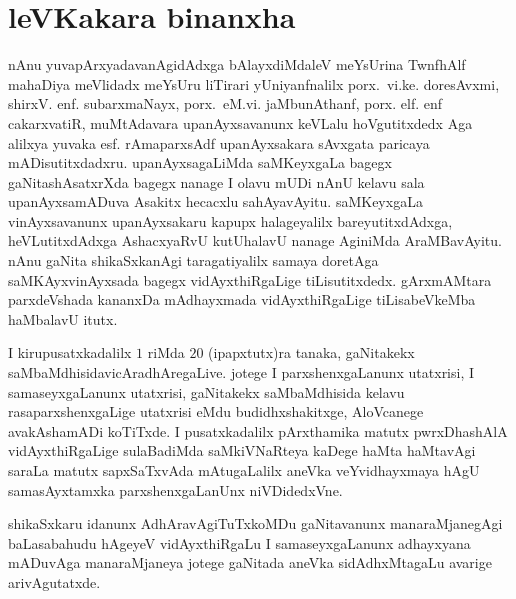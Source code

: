 {
\makeatletter
\def\@makechapterhead#1{%
  \vspace*{5\p@}%
  {\parindent \z@ \raggedright \normalfont
    \ifnum \c@secnumdepth >\m@ne
      \if@mainmatter
        \LARGE\bfseries \@chapapp\space\thechapter
        \vskip 4pt
        \par\nobreak
        \vskip 5\p@
      \fi
    \fi
    \interlinepenalty\@M
    \LARGE\bfseries #1\par\nobreak
    \vskip 15\p@
  }}
  \makeatother
 \chapter{leVKakara binanxha}


\qquad nAnu yuvapArxyadavanAgidAdxga  bAlayxdiMdaleV meYsUrina TwnfhAlf mahaDiya meVlidadx meYsUru liTirari yUniyanfnalilx porx.~vi.ke. doresAvxmi, shirxV. enf. subarxmaNayx, porx.~eM.vi. jaMbunAthanf, porx. elf. enf cakarxvatiR, muMtAdavara upanAyxsavanunx keVLalu hoVgutitxdedx Aga alilxya yuvaka esf. rAmaparxsAdf upanAyxsakara sAvxgata paricaya mADisutitxdadxru.  upanAyxsagaLiMda saMKeyxgaLa bagegx gaNitashAsatxrXda bagegx nanage I olavu mUDi nAnU kelavu sala upanAyxsamADuva Asakitx hecacxlu sahAyavAyitu. saMKeyxgaLa vinAyxsavanunx upanAyxsakaru kapupx halageyalilx bareyutitxdAdxga, heVLutitxdAdxga AshacxyaRvU kutUhalavU nanage AginiMda AraMBavAyitu. nAnu gaNita shikaSxkanAgi taragatiyalilx samaya doretAga saMKAyxvinAyxsada bagegx vidAyxthiRgaLige tiLisutitxdedx. gArxmAMtara parxdeVshada kananxDa mAdhayxmada vidAyxthiRgaLige tiLisabeVkeMba haMbalavU itutx.

 I kirupusatxkadalilx $1$ riMda $20$ (ipapxtutx)ra tanaka, gaNitakekx saMbaMdhisida\break vicAradhAregaLive. jotege I parxshenxgaLanunx utatxrisi, I samaseyxgaLanunx utatxrisi, gaNitakekx saMbaMdhisida kelavu rasaparxshenxgaLige utatxrisi eMdu budidhxshakitxge, AloVcanege avakAshamADi koTiTxde. I pusatxkadalilx pArxthamika matutx pwrxDhashAlA vidAyxthiRgaLige sulaBadiMda saMkiVNaRteya kaDege haMta haMtavAgi saraLa matutx sapxSaTxvAda mAtugaLalilx aneVka veYvidhayxmaya hAgU samasAyxtamxka parxshenxgaLanUnx niVDidedxVne.

 shikaSxkaru idanunx AdhAravAgiTuTxkoMDu gaNitavanunx manaraMjanegAgi baLasa\-bahudu hAgeyeV vidAyxthiRgaLu I samaseyxgaLanunx adhayxyana mADuvAga manaraMjaneya jotege gaNitada aneVka sidAdhxMtagaLu avarige arivAgutatxde.

}
